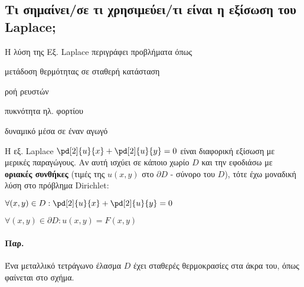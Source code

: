 \documentclass[12pt,a4paper,notitlepage,fleqn]{article}
\begin{document}
	  \subsection{Τι σημαίνει/σε τι χρησιμεύει/τι είναι η εξίσωση του Laplace;}
	  Η λύση της Εξ. Laplace περιγράφει προβλήματα όπως
	  \begin{enumparen}
	  	\item μετάδοση θερμότητας σε σταθερή κατάσταση
	  	\item ροή ρευστών \item πυκνότητα ηλ. φορτίου
	  	\item δυναμικό μέσα σε έναν αγωγό
	  \end{enumparen}


	  Η εξ. Laplace \( \displaystyle \pd[2]{u}{x} + \pd[2]{u}{y} = 0 \) είναι διαφορική
	  εξίσωση με μερικές παραγώγους. Αν αυτή ισχύει σε κάποιο χωρίο \( D \) και την εφοδιάσω
	  με \textbf{οριακές συνθήκες} (τιμές της \( u(x,y) \) στο \( \partial D \) -
	  σύνορο του \( D \)), τότε έχω μοναδική λύση στο πρόβλημα Dirichlet:
	  \begin{enumparen}
	    \item \( \forall (x,y) \in D : \pd[2]{u}{x} + \pd[2]{u}{y} = 0 \)
	    \item \( \forall (x,y) \in \partial D : u(x,y) = F(x,y) \)
      \end{enumparen}

      \paragraph{Παρ.} Ένα μεταλλικό τετράγωνο έλασμα \( D \) έχει σταθερές θερμοκρασίες
      στα άκρα του, όπως φαίνεται στο σχήμα.

\end{document}
